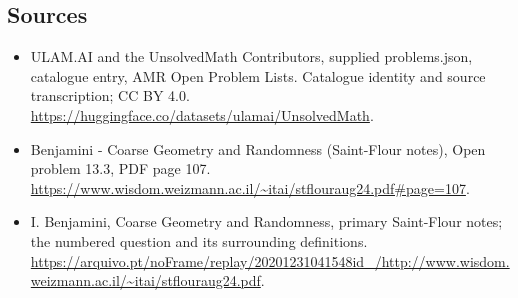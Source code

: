 \documentclass[11pt,a4paper]{article}
\begin{document}
\subsection{Sources}
\begin{itemize}
\item[S1] ULAM.AI and the UnsolvedMath Contributors, supplied problems.json, catalogue entry, AMR Open Problem Lists. Catalogue identity and source transcription; CC BY 4.0.
\url{https://huggingface.co/datasets/ulamai/UnsolvedMath}.
\item[S2] Benjamini - Coarse Geometry and Randomness (Saint-Flour notes), Open problem 13.3, PDF page 107. 
\url{https://www.wisdom.weizmann.ac.il/~itai/stflouraug24.pdf#page=107}.
\item[S3] I. Benjamini, Coarse Geometry and Randomness, primary Saint-Flour notes; the numbered question and its surrounding definitions.
\url{https://arquivo.pt/noFrame/replay/20201231041548id_/http://www.wisdom.weizmann.ac.il/~itai/stflouraug24.pdf}.
\end{itemize}
\end{document}
